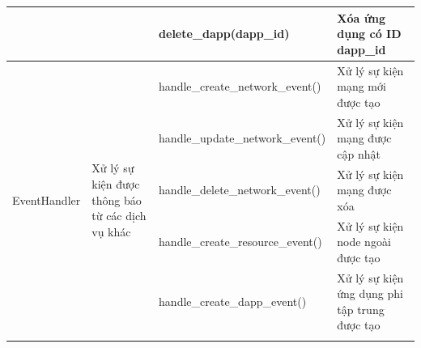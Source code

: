 \documentclass[../DoAn.tex]{subfiles}
\begin{document}
\begin{longtable}{|p{}|p{}|p{}|p{}|}
                                                   &                                                                                    & \hspace{0pt}delete\_dapp\hspace{0pt}(dapp\_id)                                    & Xóa ứng dụng có ID dapp\_id                                                                  \\ \hline
    \multirow[t]{7}{0.175\textwidth}{EventHandler} & \multirow[t]{7}{0.175\textwidth}{Xử lý sự kiện được thông báo từ các dịch vụ khác} & \hspace{0pt}handle\_\hspace{0pt}create\_\hspace{0pt}network\_\hspace{0pt}event()  & Xử lý sự kiện mạng mới được tạo                                                              \\ \cline{3-4}
                                                   &                                                                                    & \hspace{0pt}handle\_\hspace{0pt}update\_\hspace{0pt}network\_\hspace{0pt}event()  & Xử lý sự kiện mạng được cập nhật                                                             \\ \cline{3-4}
                                                   &                                                                                    & \hspace{0pt}handle\_\hspace{0pt}delete\_\hspace{0pt}network\_\hspace{0pt}event()  & Xử lý sự kiện mạng được xóa                                                                  \\ \cline{3-4}
                                                   &                                                                                    & \hspace{0pt}handle\_\hspace{0pt}create\_\hspace{0pt}resource\_\hspace{0pt}event() & Xử lý sự kiện node ngoài được tạo                                                            \\ \hline
                                                   &                                                                                    & \hspace{0pt}handle\_\hspace{0pt}create\_\hspace{0pt}dapp\_\hspace{0pt}event()     & Xử lý sự kiện ứng dụng phi tập trung được tạo                                                \\ \cline{3-4}

\end{longtable}
\end{document}
